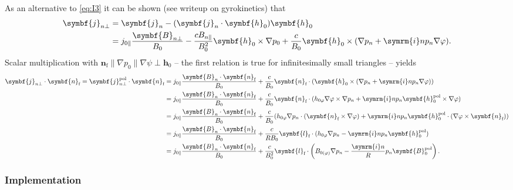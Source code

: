 \documentclass[a4paper, 10pt, english]{article}
\let\temp\vartheta
\let\vartheta\theta
\let\theta\temp
\let\temp\varphi
\let\varphi\phi
\let\phi\temp
\let\vec\symbf
\newcommand*\im{\ensuremath{\symrm{i}}}  %
\newcommand*\pol{\ensuremath{\textrm{pol}}}  %
\newcommand*\fs{\ensuremath{\textrm{f}}}  %
\begin{document}
As an alternative to \cref{eq:I3} it can be shown (see writeup on gyrokinetics) that
\begin{align}
  \vec{j}_{n \perp} &= \vec{j}_{n} - (\vec{j}_{n} \cdot \vec{h}_{0}) \vec{h}_{0} \nonumber \\
  &= j_{0 \parallel} \frac{\vec{B}_{n \perp}}{B_{0}} - \frac{c B_{n \parallel}}{B_{0}^{2}} \vec{h}_{0} \times \nabla p_{0} + \frac{c}{B_{0}} \vec{h}_{0} \times (\nabla p_{n} + \im n p_{n} \nabla \phi).
\end{align}
Scalar multiplication with $\vec{n}_{\fs} \parallel \nabla p_{0} \parallel \nabla \psi \perp \vec{h}_{0}$ -- the first relation is true for infinitesimally small triangles -- yields
\begin{align}
  \vec{j}_{n \perp} \cdot \vec{n}_{\fs} = \vec{j}_{n \perp}^{\pol} \cdot \vec{n}_{\fs} &= j_{0 \parallel} \frac{\vec{B}_{n} \cdot \vec{n}_{\fs}}{B_{0}} + \frac{c}{B_{0}} \vec{n}_{\fs} \cdot (\vec{h}_{0} \times (\nabla p_{n} + \im n p_{n} \nabla \phi)) \nonumber \\
  &= j_{0 \parallel} \frac{\vec{B}_{n} \cdot \vec{n}_{\fs}}{B_{0}} + \frac{c}{B_{0}} \vec{n}_{\fs} \cdot (h_{0 \phi} \nabla \phi \times \nabla p_{n} + \im n p_{n} \vec{h}_{0}^{\pol} \times \nabla \phi) \nonumber \\
  &= j_{0 \parallel} \frac{\vec{B}_{n} \cdot \vec{n}_{\fs}}{B_{0}} + \frac{c}{B_{0}} (h_{0 \phi} \nabla p_{n} \cdot (\vec{n}_{\fs} \times \nabla \phi) + \im n p_{n} \vec{h}_{0}^{\pol} \cdot (\nabla \phi \times \vec{n}_{\fs})) \nonumber \\
  &= j_{0 \parallel} \frac{\vec{B}_{n} \cdot \vec{n}_{\fs}}{B_{0}} + \frac{c}{R B_{0}} \vec{l}_{\fs} \cdot (h_{0 \phi} \nabla p_{n} - \im n p_{n} \vec{h}_{0}^{\pol}) \nonumber \\
  &= j_{0 \parallel} \frac{\vec{B}_{n} \cdot \vec{n}_{\fs}}{B_{0}} + \frac{c}{B_{0}^{2}} \vec{l}_{\fs} \cdot \left( B_{0 (\phi)} \nabla p_{n} - \frac{\im n}{R} p_{n} \vec{B}_{0}^{\pol} \right). \label{eq:I3_alt}
\end{align}

\subsubsection{Implementation}
\end{document}
